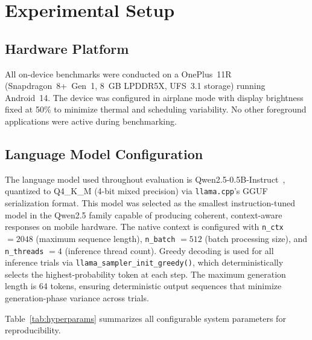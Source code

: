\documentclass[journal]{IEEEtran}
\begin{document}
\section{Experimental Setup}
\label{sec:experiments}

\subsection{Hardware Platform}
\label{sec:hardware}

All on-device benchmarks were conducted on a OnePlus~11R (Snapdragon~8+~Gen~1, 8~GB LPDDR5X, UFS~3.1 storage) running Android~14. The device was configured in airplane mode with display brightness fixed at 50\% to minimize thermal and scheduling variability. No other foreground applications were active during benchmarking.

\subsection{Language Model Configuration}
\label{sec:model_config}

The language model used throughout evaluation is Qwen2.5-0.5B-Instruct~\cite{qwen25}, quantized to Q4\_K\_M (4-bit mixed precision) via \texttt{llama.cpp}'s GGUF serialization format. This model was selected as the smallest instruction-tuned model in the Qwen2.5 family capable of producing coherent, context-aware responses on mobile hardware. The native context is configured with \texttt{n\_ctx} $= 2048$ (maximum sequence length), \texttt{n\_batch} $= 512$ (batch processing size), and \texttt{n\_threads} $= 4$ (inference thread count). Greedy decoding is used for all inference trials via \texttt{llama\_sampler\_init\_greedy()}, which deterministically selects the highest-probability token at each step. The maximum generation length is 64 tokens, ensuring deterministic output sequences that minimize generation-phase variance across trials.

Table~\ref{tab:hyperparams} summarizes all configurable system parameters for reproducibility.
\end{document}

